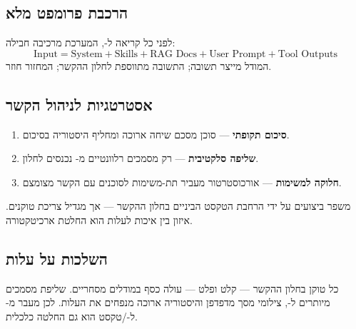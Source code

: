 \subsection{הרכבת פרומפט מלא}

לפני כל קריאה ל-, המערכת מרכיבה חבילה:
\[
  \text{Input} = \text{System} + \text{Skills} + \text{RAG Docs} + \text{User Prompt} + \text{Tool Outputs}
\]
המודל מייצר תשובה; התשובה מתווספת לחלון ההקשר; המחזור חוזר.

\subsection{אסטרטגיות לניהול הקשר}

\begin{enumerate}[rightmargin=2em]
  \item \textbf{סיכום תקופתי} --- סוכן מסכם שיחה ארוכה ומחליף היסטוריה בסיכום.
  \item \textbf{שליפה סלקטיבית} --- רק מסמכים רלוונטיים מ- נכנסים לחלון.
  \item \textbf{חלוקה למשימות} --- אורכוסטרטור מעביר תת-משימות לסוכנים עם הקשר מצומצם.
\end{enumerate}

\begin{insightbox}
 \cite{wei2022chain} משפר ביצועים על ידי הרחבת
הטקסט הביניים בחלון ההקשר --- אך מגדיל צריכת טוקנים. איזון בין
איכות לעלות הוא החלטת ארכיטקטורה.
\end{insightbox}

\subsection{השלכות על עלות}

כל טוקן בחלון ההקשר --- קלט ופלט --- עולה כסף במודלים מסחריים.
שליפת מסמכים מיותרים ל-, צילומי מסך מדפדפן והיסטוריה ארוכה
מנפחים את העלות. לכן מעבר מ- ל-/טקסט הוא גם החלטה
כלכלית.
